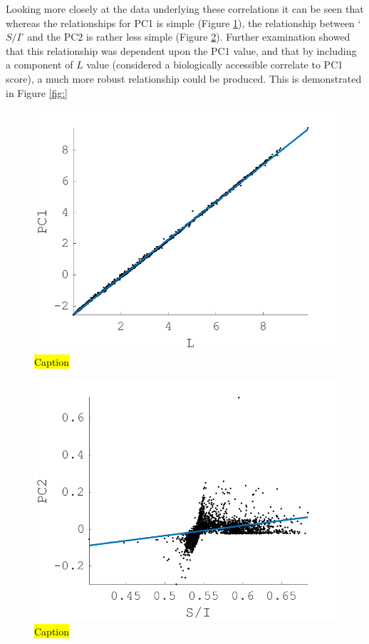 Looking more closely at the data underlying these correlations it can be seen that whereas the relationships for \gls{PC1} is simple (Figure \ref{fig:L-PC1}), the relationship between `$S/I$' and the \gls{PC2} is rather less simple (Figure \ref{fig:S/I-PC2}). Further examination showed that this relationship was dependent upon the PC1 value, and that by including a component of $L$ value (considered a biologically accessible correlate to \gls{PC1} score), a much more robust relationship could be produced. This is demonstrated in Figure \ref{fig:}

\begin{figure}[htbp]
 \includegraphics[max width=\textwidth]{figs/comp/melcomp_3/20.png}
 \caption{\hl{Caption}}
 \label{fig:L-PC1}
\end{figure} 

\begin{figure}[htbp]
 \includegraphics[max width=\textwidth]{figs/comp/melcomp_3/21.png}
 \caption{\hl{Caption}}
 \label{fig:S/I-PC2}
\end{figure} 






